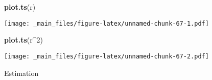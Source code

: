 \documentclass[
]{book}
\newenvironment{Shaded}{\begin{snugshade}}{\end{snugshade}}
\newcommand{\DecValTok}[1]{\textcolor[rgb]{0.00,0.00,0.81}{#1}}
\newcommand{\FunctionTok}[1]{\textcolor[rgb]{0.13,0.29,0.53}{\textbf{#1}}}
\newcommand{\NormalTok}[1]{#1}
\newcommand{\SpecialCharTok}[1]{\textcolor[rgb]{0.81,0.36,0.00}{\textbf{#1}}}
\begin{document}
\begin{Shaded}
\begin{Highlighting}[]
\FunctionTok{plot.ts}\NormalTok{(r)}
\end{Highlighting}
\end{Shaded}

\texttt{[image: \_main\_files/figure-latex/unnamed-chunk-67-1.pdf]}

\begin{Shaded}
\begin{Highlighting}[]
\FunctionTok{plot.ts}\NormalTok{(r}\SpecialCharTok{\^{}}\DecValTok{2}\NormalTok{)}
\end{Highlighting}
\end{Shaded}

\texttt{[image: \_main\_files/figure-latex/unnamed-chunk-67-2.pdf]}

Estimation
\end{document}
